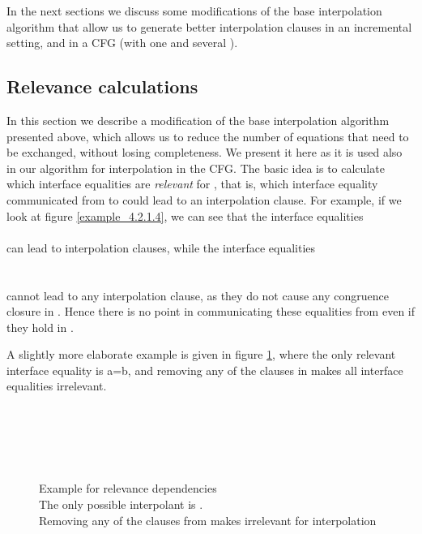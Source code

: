 In the next sections we discuss some modifications of the base interpolation algorithm that allow us to generate better interpolation clauses in an incremental setting, and in a CFG (with one  and several ).

\subsection{Relevance calculations}
In this section we describe a modification of the base interpolation algorithm presented above, 
which allows us to reduce the number of equations that need to be exchanged, without losing completeness.
We present it here as it is used also in our algorithm for interpolation in the CFG.
The basic idea is to calculate which interface equalities are \emph{relevant} for , that is, which interface equality communicated from  to  could lead to an interpolation clause. For example, if we look at figure \ref{example_4.2.1.4}, we can see that the interface equalities \\
\\
can lead to interpolation clauses, while the interface equalities \\
\\
 \\
cannot lead to any interpolation clause, as they do not cause any congruence closure in .
Hence there is no point in communicating these equalities from  even if they hold in .

A slightly more elaborate example is given in figure \ref{f.fs.ug.rc.1}, where the only relevant interface equality is a=b, and removing any of the clauses in  makes all interface equalities irrelevant.
\begin{figure}[H]
\\
\\
\\
\\
\caption{Example for relevance dependencies\\
The only possible interpolant is .\\
Removing any of the clauses from  makes  irrelevant for interpolation
}
\label{f.fs.ug.rc.1}
\end{figure}
 

